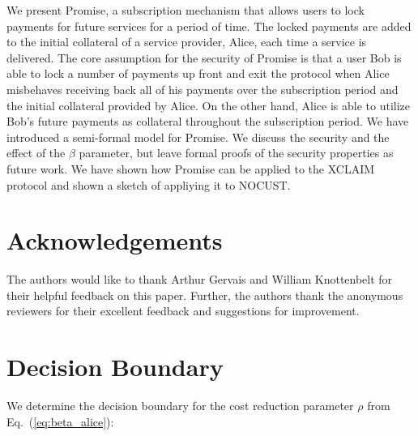 \documentclass[runningheads]{llncs}
\newcommand{\sys}{Promise\xspace}
\begin{document}
We present \sys, a subscription mechanism that allows users to lock payments for future services for a period of time.
The locked payments are added to the initial collateral of a service provider, Alice, each time a service is delivered.
The core assumption for the security of \sys is that a user Bob is able to lock a number of payments up front and exit the protocol when Alice misbehaves receiving back all of his payments over the subscription period and the initial collateral provided by Alice.
On the other hand, Alice is able to utilize Bob's future payments as collateral throughout the subscription period.
We have introduced a semi-formal model for \sys.
We discuss the security and the effect of the $\beta$ parameter, but leave formal proofs of the security properties as future work.
We have shown how \sys can be applied to the XCLAIM protocol and shown a sketch of appliying it to NOCUST.

\section*{Acknowledgements}
The authors would like to thank Arthur Gervais and William Knottenbelt for their helpful feedback on this paper. Further, the authors thank the anonymous reviewers for their excellent feedback and suggestions for improvement.




\appendix

\section{Decision Boundary}
\label{app:decision-bound}

We determine the decision boundary for the cost reduction parameter $\rho$ from Eq.~(\ref{eq:beta_alice}):
\end{document}

